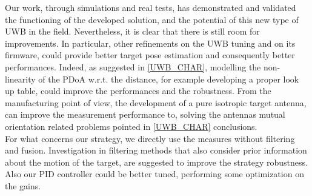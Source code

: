 Our work, through simulations and real tests, has demonstrated and validated the functioning of the developed solution, and the potential of this new type of UWB in the field. Nevertheless, it is clear that there is still room for improvements. In particular, other refinements on the UWB tuning and on its firmware, could provide better target pose estimation and consequently better performances. Indeed, as suggested in \autoref{UWB_CHAR}, modelling the non-linearity of the PDoA w.r.t. the distance, for example developing a proper look up table, could improve the performances and the robustness. From the manufacturing point of view, the development of a pure isotropic target antenna, can improve the measurement performance to, solving the antennas mutual orientation related problems pointed in \autoref{UWB_CHAR} conclusions.\\

For what concerns our strategy, we directly use the measures without filtering and fusion. Investigation in filtering methods that also consider prior information about the motion of the target, are suggested to improve the strategy robustness. Also our PID controller could be better tuned, performing some optimization on the gains.